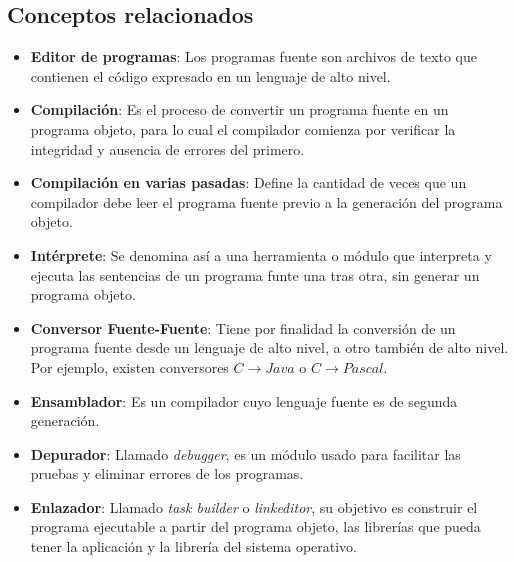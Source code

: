 \documentclass[12pt]{article}
\begin{document}
\subsection{Conceptos relacionados}
\begin{itemize}
	\item \textbf{Editor de programas}: Los programas fuente son archivos de texto que contienen el código expresado en un lenguaje de alto nivel.

	\item \textbf{Compilación}: Es el proceso de convertir un programa fuente en un programa objeto, para lo cual el compilador comienza por verificar la integridad y ausencia de errores del primero.

	\item \textbf{Compilación en varias pasadas}: Define la cantidad de veces que un compilador debe leer el programa fuente previo a la generación del programa objeto.

	\item \textbf{Intérprete}: Se denomina así a una herramienta o módulo que interpreta y ejecuta las sentencias de un programa funte una tras otra, sin generar un programa objeto.


	\item \textbf{Conversor Fuente-Fuente}: Tiene por finalidad la conversión de un programa fuente desde un lenguaje de alto nivel, a otro también de alto nivel. Por ejemplo, existen conversores $ C \to Java $ o $ C \to Pascal $.

	\item \textbf{Ensamblador}: Es un compilador cuyo lenguaje fuente es de segunda generación.

	\item \textbf{Depurador}: Llamado \textit{debugger}, es un módulo usado para facilitar las pruebas y eliminar errores de los programas.

	\item \textbf{Enlazador}: Llamado \textit{task builder} o \textit{linkeditor}, su objetivo es construir el programa ejecutable a partir del programa objeto, las librerías que pueda tener la aplicación y la librería del sistema operativo.
\end{itemize}
\end{document}

